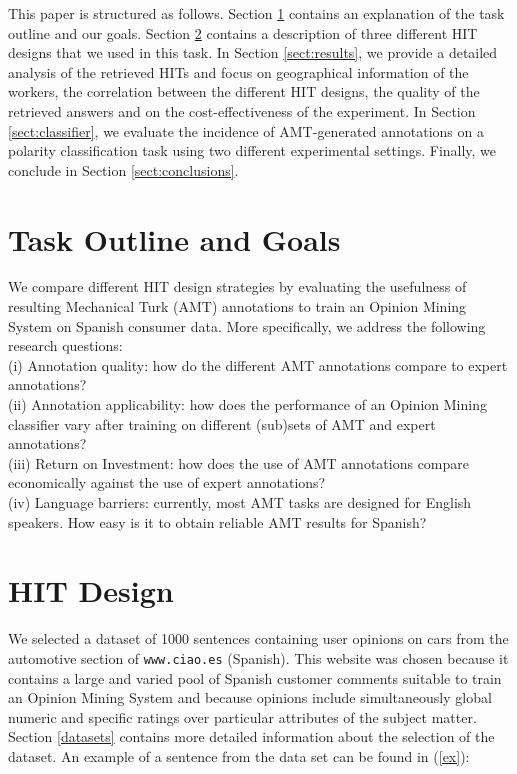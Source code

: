\documentclass[11pt,letterpaper]{article}
\begin{document}
This paper is structured as follows. Section \ref{sect:outline} contains an explanation of the task outline and our goals. Section \ref{sect:design} contains a description of three different HIT designs that we used in this task. In Section \ref{sect:results}, we provide a detailed analysis of the retrieved HITs and focus on geographical information of the workers, the correlation between the different HIT designs, the quality of the retrieved answers and on the cost-effectiveness of  the experiment. In Section \ref{sect:classifier}, we evaluate the incidence of AMT-generated annotations on a polarity classification task using two different experimental settings. Finally, we conclude in Section \ref{sect:conclusions}.

\section{Task Outline and Goals}
\label{sect:outline}

We compare different HIT design strategies by evaluating the usefulness of resulting Mechanical Turk (AMT) annotations to train an Opinion Mining System on Spanish consumer data. More specifically, we address the following research questions:\\
 \indent (i) Annotation quality: how do the different AMT annotations compare to expert annotations?\\
 \indent (ii) Annotation applicability: how does the performance of an Opinion Mining classifier vary after training on different (sub)sets of AMT and expert annotations?\\
 \indent (iii) Return on Investment: how does the use of AMT annotations compare economically against the use of expert annotations?\\
 \indent (iv) Language barriers: currently, most AMT tasks are designed for English speakers. How easy is it to obtain reliable AMT results for Spanish? 

\section{HIT Design}
\label{sect:design}

We selected a dataset of 1000 sentences containing user opinions on cars from the automotive section of \texttt{www.ciao.es} (Spanish). This website was chosen because it contains a large and varied pool of Spanish customer comments suitable to train an Opinion Mining System and because opinions include simultaneously global numeric and specific ratings over particular attributes of the subject matter. Section \ref{datasets} contains more detailed information about the selection of the dataset. An example of a sentence from the data set can be found in (\ref{ex}):
\end{document}
